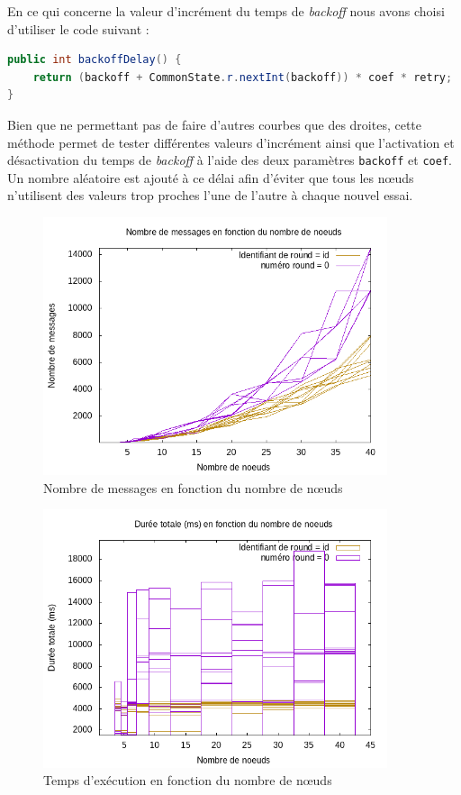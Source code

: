 \documentclass[french]{article}
\begin{document}
En ce qui concerne la valeur d'incrément du temps de \emph{backoff} nous avons choisi d'utiliser le code suivant :

\begin{lstlisting}[language=java]
public int backoffDelay() {
	return (backoff + CommonState.r.nextInt(backoff)) * coef * retry;
}
\end{lstlisting}
Bien que ne permettant pas de faire d'autres courbes que des droites, cette méthode permet de tester différentes valeurs d'incrément ainsi que l'activation et désactivation du temps de \emph{backoff} à l'aide des deux paramètres \lstinline{backoff} et \lstinline{coef}.
Un nombre aléatoire est ajouté à ce délai afin d'éviter que tous les nœuds n'utilisent des valeurs trop proches l'une de l'autre à chaque nouvel essai.

\begin{figure}[hb]
	\centering
	\includegraphics[width=0.9\textwidth]{NoeudsMessages.png} %
	\caption{Nombre de messages en fonction du nombre de nœuds}
	\label{fig:message-node}
\end{figure}


\begin{figure}[ht]
	\centering
	\includegraphics[width=0.9\textwidth]{NoeudDuree.png} %
	\caption{Temps d'exécution en fonction du nombre de nœuds}
	\label{fig:time-node}
\end{figure}
\end{document}
